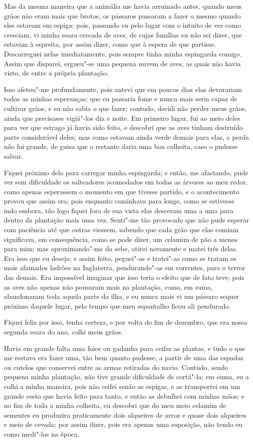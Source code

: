Mas da mesma maneira que a animália me havia arruinado antes, quando
meus grãos não eram mais que brotos, os pássaros passaram a fazer o
mesmo quando eles estavam em espiga; pois, passando eu pelo lugar com o
intuito de ver como cresciam, vi minha seara cercada de aves, de cujas
famílias eu não sei dizer, que estavam à espreita, por assim dizer, como
que à espera de que partisse. Descarreguei nelas imediatamente, pois
sempre tinha minha espingarda comigo. Assim que disparei, ergueu"-se uma
pequena nuvem de aves, as quais não havia visto, de entre a própria
plantação.

Isso afetou"-me profundamente, pois antevi que em poucos dias elas
devorariam todas as minhas esperanças; que eu passaria fome e nunca mais
seria capaz de cultivar grãos; e eu não sabia o que fazer; contudo,
decidi não perder meus grãos, ainda que precisasse vigiá"-los dia e
noite. Em primeiro lugar, fui ao meio deles para ver que estrago já
havia sido feito, e descobri que as aves tinham destruído parte
considerável deles; mas como estavam ainda verde demais para elas, a
perda não foi grande, de guisa que o restante daria uma boa colheita,
caso o pudesse salvar.

Fiquei próximo dela para carregar minha espingarda; e então, me
afastando, pude ver sem dificuldade os salteadores acomodados em todas
as árvores ao meu redor, como apenas esperassem o momento em que tivesse
partido, e o acontecimento provou que assim era; pois enquanto caminhava
para longe, como se estivesse indo embora, tão logo fiquei fora de sua
vista elas desceram uma a uma para dentro da plantação mais uma vez.
Senti"-me tão provocado que não pude esperar com paciência até que outras
viessem, sabendo que cada grão que elas comiam significava, em
consequência, como se pode dizer, um celamim de pão a menos para mim;
mas aproximando"-me da sebe, atirei novamente e matei três delas. Era
isso que eu deseja; e assim feito, peguei"-as e tratei"-as como se tratam
os mais afamados ladrões na Inglaterra, pendurando"-as em correntes, para
o terror das demais. Era impossível imaginar que isso teria o efeito que
de fato teve; pois as aves não apenas não pousaram mais na plantação,
como, em suma, abandonaram toda aquela parte da ilha, e eu nunca mais vi
um pássaro sequer próximo daquele lugar, pelo tempo que meu espantalho
ficou ali pendurado.

Fiquei feliz por isso, tenha certeza, e por volta do fim de dezembro,
que era nossa segunda seara do ano, colhi meus grãos.

Havia em grande falta uma foice ou gadanha para ceifar as plantas, e
tudo o que me restava era fazer uma, tão bem quanto pudesse, a partir de
uma das espadas ou cutelos que conservei entre as armas retiradas do
navio. Contudo, sendo pequena minha plantação, não tive grande
dificuldade de cortá"-la; em suma, eu a colhi a minha maneira, pois não
ceifei senão as espigas, e as transportei em um grande cesto que havia
feito para tanto, e então as debulhei com minhas mãos; e no fim de toda
a minha colheita, eu descobri que do meu meio celamim de sementes eu
produzira praticamente dois alqueires de arroz e quase dois alqueires e
meio de cevada; por assim dizer, pois era apenas uma suposição, não
tendo eu como medi"-los na época.

